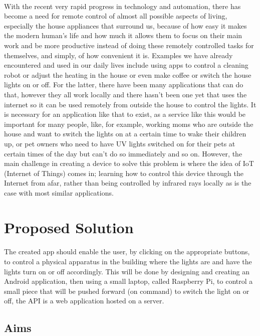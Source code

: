 \documentclass[a4paper, 12pt, oneside]{book}
\begin{document}
		\paragraph{}With the recent very rapid progress in technology and automation, there has become a need for remote control of almost all possible aspects of living, especially the house appliances that surround us, because of how easy it makes the modern human’s life and how much it allows them to focus on their main work and be more productive instead of doing these remotely controlled tasks for themselves, and simply, of how convenient it is. Examples we have already encountered and used in our daily lives include using apps to control a cleaning robot or adjust the heating in the house or even make coffee or switch the house lights on or off. For the latter, there have been many applications that can do that, however they all work locally and there hasn’t been one yet that uses the internet so it can be used remotely from outside the house to control the lights. It is necessary for an application like that to exist, as a service like this would be important for many people, like, for example, working moms who are outside the house and want to switch the lights on at a certain time to wake their children up, or pet owners who need to have UV lights switched on for their pets at certain times of the day but can’t do so immediately and so on. However, the main challenge in creating a device to solve this problem is where the idea of IoT (Internet of Things) comes in; learning how to control this device through the Internet from afar, rather than being controlled by infrared rays locally as is the case with most similar applications.
		\section{Proposed Solution}
		\paragraph{}The created app should enable the user, by clicking on the appropriate buttons, to control a physical apparatus in the building where the lights are and have the lights turn on or off accordingly. This will be done by designing and creating an Android application, then using a small laptop, called Raspberry Pi, to control a small piece that will be pushed forward (on command) to switch the light on or off, the API is a web application hosted on a server.
		
		\subsection{Aims}
\end{document}
